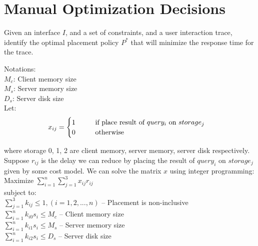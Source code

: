 


\section*{Manual Optimization Decisions}

\begin{problem}
  Given an interface $I$, and a set of constraints, and a user interaction trace, identify the optimal placement policy $P^*$ that will minimize the response time for the trace.
\end{problem}

Notations:\\

\hspace{10mm} $M_c$: Client memory size\\

\hspace{10mm} $M_s$: Server memory size\\

\hspace{10mm} $D_s$: Server disk size\\

Let:
\begin{equation}
	x_{ij}=
	\begin{cases}
		1 \hspace{10mm} \text{if place result of $query_i$ on $storage_j$} \\
		0 \hspace{10mm} \text{otherwise}
	\end{cases}
\end{equation}

where storage 0, 1, 2 are client memory, server memory, server disk respectively. Suppose $r_{ij}$ is the delay we can reduce by placing the result of $query_i$ on $storage_j$ given by some cost model. We can solve the matrix $x$ using integer programming:\\

\hspace{10mm} Maximize $\sum_{i=1}^{n} \sum_{j=1}^{3} x_{ij} r_{ij}$\\

subject to:\\

\hspace{10mm} $\sum_{j=1}^{3} k_{ij} \le 1, (i=1,2,...,n)$ \hspace{10mm} -- Placement is non-inclusive\\

\hspace{10mm} $\sum_{i=1}^{n} k_{i0}s_i \le M_c$ \hspace{10mm} -- Client memory size\\

\hspace{10mm} $\sum_{i=1}^{n} k_{i1}s_i \le M_s$ \hspace{10mm} -- Server memory size\\

\hspace{10mm} $\sum_{i=1}^{n} k_{i2}s_i \le D_s$ \hspace{10mm} -- Server disk size\\
  
